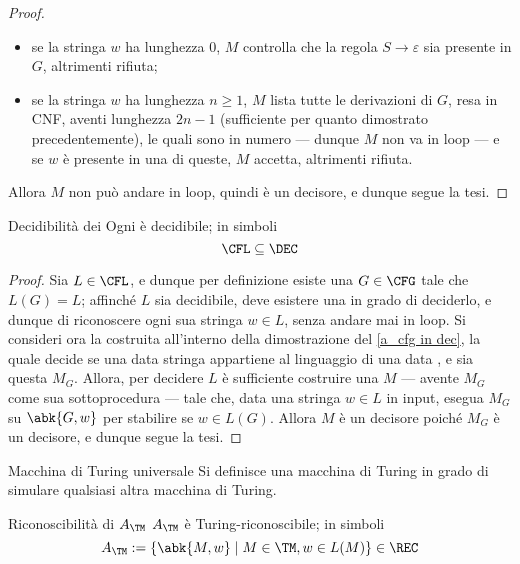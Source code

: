 \documentclass[a4paper, 12pt]{report}
\begin{document}
\begin{proof}
        \begin{itemize}
            \item se la stringa $w$ ha lunghezza 0, $M$ controlla che la regola $S \to \varepsilon$ sia presente in $G$, altrimenti rifiuta;
            \item se la stringa $w$ ha lunghezza $n \ge 1$, $M$ lista tutte le derivazioni di $G$, resa in CNF, aventi lunghezza $2n - 1$ (sufficiente per quanto dimostrato precedentemente), le quali sono in numero  --- dunque $M$ non va in loop --- e se $w$ è presente in una di queste, $M$ accetta, altrimenti rifiuta.
        \end{itemize}

        Allora $M$ non può andare in loop, quindi è un decisore, e dunque segue la tesi.
    \end{proof}

    \begin{framedcor}{Decidibilità dei \CFL}
        Ogni \CFL è decidibile; in simboli $$\CFL \subseteq \DEC$$
    \end{framedcor}

    \begin{proof}
        Sia $L \in \CFL$, e dunque per definizione esiste una $G \in \CFG$ tale che $L(G) = L$; affinché $L$ sia decidibile, deve esistere una \TM in grado di deciderlo, e dunque di riconoscere ogni sua stringa $w \in L$, senza andare mai in loop. Si consideri ora la \TM costruita all'interno della dimostrazione del \cref{a_cfg in dec}, la quale decide se una data stringa appartiene al linguaggio di una data \CFG, e sia questa $M_G$. Allora, per decidere $L$ è sufficiente costruire una \TM $M$ --- avente $M_G$ come sua sottoprocedura --- tale che, data una stringa $w \in L$ in input, esegua $M_G$ su $\abk{G, w}$ per stabilire se $w \in L(G)$. Allora $M$ è un decisore poiché $M_G$ è un decisore, e dunque segue la tesi.
    \end{proof}

    \begin{frameddefn}{Macchina di Turing universale}
        Si definisce  una macchina di Turing in grado di simulare qualsiasi altra macchina di Turing.
    \end{frameddefn}

    \begin{framedthm}[label={a_tm in rec}]{Riconoscibilità di $A_\TM$}
        $A_\TM$ è Turing-riconoscibile; in simboli $$A_\TM := \{\abk{M, w} \mid M \in \TM, w \in L(M)\} \in \REC$$
    \end{framedthm}
\end{document}
